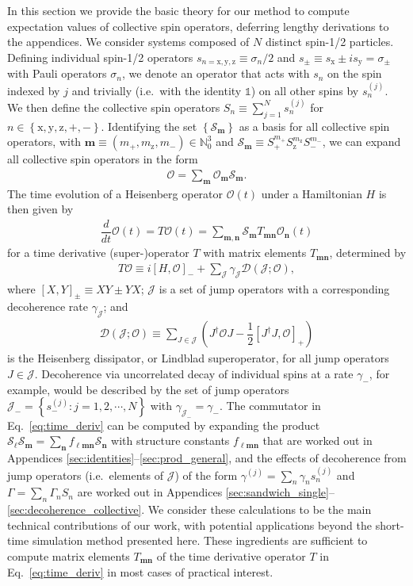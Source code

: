 \documentclass[pra,reprint,longbibliography]{revtex4-1}
\newcommand{\f}[2]{\dfrac{#1}{#2}} %
\newcommand{\p}[1]{\left(#1\right)} %
\renewcommand{\sp}[1]{\left[#1\right]} %
\renewcommand{\set}[1]{\left\{#1\right\}} %
\renewcommand{\v}{\bm} %
\newcommand{\D}{\mathcal{D}}
\newcommand{\J}{\mathcal{J}}
\renewcommand{\O}{\mathcal{O}}
\renewcommand{\S}{\mathcal{S}}
\newcommand{\N}{\mathbb{N}}
\newcommand{\z}{\text{z}}
\newcommand{\x}{\text{x}}
\newcommand{\y}{\text{y}}
\newcommand{\1}{\mathds{1}}
\begin{document}
In this section we provide the basic theory for our method to compute
expectation values of collective spin operators, deferring lengthy
derivations to the appendices.  We consider systems composed of $N$
distinct spin-1/2 particles.  Defining individual spin-1/2 operators
$s_{n=\x,\y,\z}\equiv\sigma_n/2$ and
$s_\pm\equiv s_\x\pm is_\y=\sigma_\pm$ with Pauli operators
$\sigma_n$, we denote an operator that acts with $s_n$ on the spin
indexed by $j$ and trivially (i.e.~with the identity $\1$) on all
other spins by $s_n^{(j)}$.  We then define the collective spin
operators $S_n\equiv\sum_{j=1}^Ns_n^{(j)}$ for
$n\in\set{\x,\y,\z,+,-}$.  Identifying the set $\set{\S_{\v m}}$ as a
basis for all collective spin operators, with
$\v m\equiv\p{m_+,m_\z,m_-}\in\N_0^3$ and
$\S_{\v m}\equiv S_+^{m_+} S_\z^{m_\z} S_-^{m_-}$, we can expand all
collective spin operators in the form
\begin{align}
  \O = \sum_{\v m} \O_{\v m} \S_{\v m}.
\end{align}
The time evolution of a Heisenberg operator $\O\p{t}$ under a
Hamiltonian $H$ is then given by
\begin{align}
  \f{d}{dt} \O\p{t}
  = T \O\p{t}
  = \sum_{\v m, \v n} \S_{\v m} T_{\v m\v n} \O_{\v n}\p{t}
  \label{eq:EOM}
\end{align}
for a time derivative (super-)operator $T$ with matrix elements
$T_{\v m\v n}$, determined by
\begin{align}
  T \O \equiv i \sp{H, \O}_- + \sum_\J \gamma_\J \D\p{\J; \O},
  \label{eq:time_deriv}
\end{align}
where $\sp{X,Y}_\pm\equiv XY\pm YX$; $\J$ is a set of jump operators
with a corresponding decoherence rate $\gamma_\J$; and
\begin{align}
  \D\p{\J;\O}
  \equiv \sum_{J\in\J} \p{J^\dag \O J - \f12\sp{J^\dag J,\O}_+}
\end{align}
is the Heisenberg dissipator, or Lindblad superoperator, for all jump
operators $J\in\J$.  Decoherence via uncorrelated decay of individual
spins at a rate $\gamma_-$, for example, would be described by the set
of jump operators $\J_-=\set{s_-^{(j)}:j=1,2,\cdots,N}$ with
$\gamma_{\J_-}=\gamma_-$.  The commutator in Eq.~\eqref{eq:time_deriv}
can be computed by expanding the product
$\S_{\v\ell}\S_{\v m}=\sum_{\v n}f_{\v\ell\v m\v n}\S_{\v n}$ with
structure constants $f_{\v\ell\v m\v n}$ that are worked out in
Appendices \ref{sec:identities}--\ref{sec:prod_general}, and the
effects of decoherence from jump operators (i.e.~elements of $\J$) of
the form $\gamma^{(j)}=\sum_n\gamma_ns_n^{(j)}$ and
$\Gamma=\sum_n\Gamma_nS_n$ are worked out in Appendices
\ref{sec:sandwich_single}--\ref{sec:decoherence_collective}.  We
consider these calculations to be the main technical contributions of
our work, with potential applications beyond the short-time simulation
method presented here.  These ingredients are sufficient to compute
matrix elements $T_{\v m\v n}$ of the time derivative operator $T$ in
Eq.~\eqref{eq:time_deriv} in most cases of practical interest.
\end{document}
